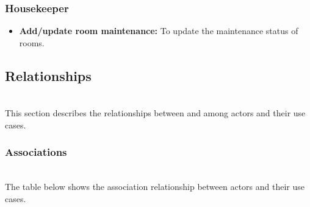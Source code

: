 \subsubsection{Housekeeper}\label{N7CobNvURytA2E2JorKlN}

\begin{itemize}
\item
\protect{}\label{waA7qXAeCBjsSyvm_mNmM}
\textbf{Add/update room maintenance:} To update the maintenance status of rooms.
\end{itemize}

\subsection{Relationships}\label{jArZQlLreqvtWAaAzOPxp}
\\
This section describes the relationships between and among actors and their use cases.

\subsubsection{Associations}\label{dcpvRCfm0i6DUxbs5r8TZ}
\\
The table below shows the association relationship between actors and their use cases.

